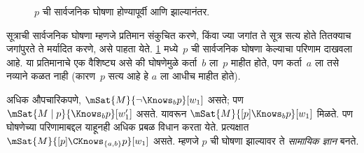 \begin{figure}
  \begin{center}
  \end{center}
  \caption{$p$ ची सार्वजनिक घोषणा होण्यापूर्वी आणि झाल्यानंतर.}
  \label{aml:el:psm:fig:announcement-example}
\end{figure}

सूत्राची सार्वजनिक घोषणा म्हणजे प्रतिमान
संकुचित करणे, किंवा ज्या जगांत ते सूत्र सत्य
होते तितक्याच जगांपुरते ते मर्यादित करणे, असे पाहता
येते. \ref{aml:el:psm:fig:announcement-example} मध्ये~$p$ ची
सार्वजनिक घोषणा केल्याचा परिणाम दाखवला आहे.
या प्रतिमानाचे एक वैशिष्ट्य असे की घोषणेमुळे
कर्ता~$b$ ला~$p$ माहीत होते, पण कर्ता~$a$ ला
तसे नव्याने कळत नाही (कारण~$p$ सत्य आहे हे
$a$ ला आधीच माहीत होते).

अधिक औपचारिकपणे, $\mSat{M}{\lnot \Knows_b p}[w_1]$
असते; पण $\mSat{M
\mid p}{\Knows_b p}[w'_1]$ असते. यावरून
$\mSat{M}{[p] \Knows_b
p}[w_1]$ मिळते. पण घोषणेच्या परिणामाबद्दल
याहूनही अधिक प्रबळ विधान करता येते. प्रत्यक्षात
$\mSat{M}{[p]\CKnows_{\{a,b\}} p}[w_1]$ असते.
म्हणजे $p$ ची घोषणा झाल्यावर ते \emph{सामायिक ज्ञान}
बनते.

